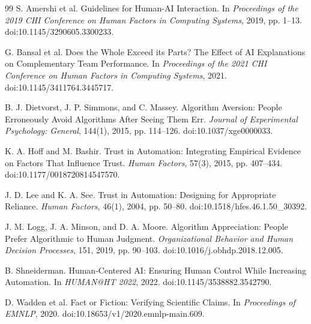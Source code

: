 \documentclass[11pt,a4paper]{article}
\begin{document}
\begin{thebibliography}{99}
S. Amershi et al. Guidelines for Human-AI Interaction. In \textit{Proceedings of the 2019 CHI Conference on Human Factors in Computing Systems}, 2019, pp. 1--13. doi:10.1145/3290605.3300233.

G. Bansal et al. Does the Whole Exceed its Parts? The Effect of AI Explanations on Complementary Team Performance. In \textit{Proceedings of the 2021 CHI Conference on Human Factors in Computing Systems}, 2021. doi:10.1145/3411764.3445717.

B. J. Dietvorst, J. P. Simmons, and C. Massey. Algorithm Aversion: People Erroneously Avoid Algorithms After Seeing Them Err. \textit{Journal of Experimental Psychology: General}, 144(1), 2015, pp. 114--126. doi:10.1037/xge0000033.

K. A. Hoff and M. Bashir. Trust in Automation: Integrating Empirical Evidence on Factors That Influence Trust. \textit{Human Factors}, 57(3), 2015, pp. 407--434. doi:10.1177/0018720814547570.

J. D. Lee and K. A. See. Trust in Automation: Designing for Appropriate Reliance. \textit{Human Factors}, 46(1), 2004, pp. 50--80. doi:10.1518/hfes.46.1.50\_30392.

J. M. Logg, J. A. Minson, and D. A. Moore. Algorithm Appreciation: People Prefer Algorithmic to Human Judgment. \textit{Organizational Behavior and Human Decision Processes}, 151, 2019, pp. 90--103. doi:10.1016/j.obhdp.2018.12.005.

B. Shneiderman. Human-Centered AI: Ensuring Human Control While Increasing Automation. In \textit{HUMAN@HT 2022}, 2022. doi:10.1145/3538882.3542790.

D. Wadden et al. Fact or Fiction: Verifying Scientific Claims. In \textit{Proceedings of EMNLP}, 2020. doi:10.18653/v1/2020.emnlp-main.609.

\end{thebibliography}
\end{document}
